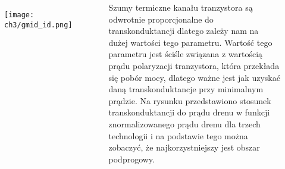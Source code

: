 \begin{frame}[t]
    \begin{block}{\dk}
    \end{block}
    \begin{columns}
        \begin{figure}[H]
            \texttt{[image: ch3/gmid\_id.png]} 
        \end{figure}
    
        Szumy termiczne kanału tranzystora są odwrotnie proporcjonalne do transkonduktancji dlatego zależy nam na dużej wartości tego parametru. Wartość tego parametru jest ściśle związana z wartością prądu polaryzacji tranzystora, która przekłada się pobór mocy, dlatego ważne jest jak uzyskać daną transkonduktancje przy minimalnym prądzie. 
        Na rysunku przedstawiono stosunek transkonduktancji do prądu drenu w funkcji znormalizowanego prądu drenu dla trzech technologii i na podstawie tego można zobaczyć, że najkorzystniejszy jest obszar podprogowy.
     \end{columns}
\end{frame}

